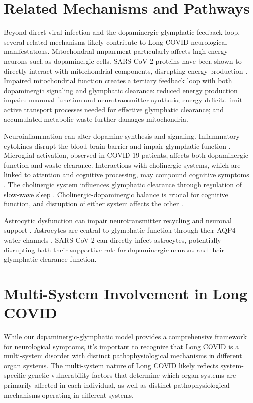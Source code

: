 \documentclass[12pt]{article}
\begin{document}
\section{Related Mechanisms and Pathways}

Beyond direct viral infection and the dopaminergic-glymphatic feedback loop, several related mechanisms likely contribute to Long COVID neurological manifestations. Mitochondrial impairment particularly affects high-energy neurons such as dopaminergic cells. SARS-CoV-2 proteins have been shown to directly interact with mitochondrial components, disrupting energy production \citep{Singh2020}. Impaired mitochondrial function creates a tertiary feedback loop with both dopaminergic signaling and glymphatic clearance: reduced energy production impairs neuronal function and neurotransmitter synthesis; energy deficits limit active transport processes needed for effective glymphatic clearance; and accumulated metabolic waste further damages mitochondria.

Neuroinflammation can alter dopamine synthesis and signaling. Inflammatory cytokines disrupt the blood-brain barrier and impair glymphatic function \citep{Banks2015}. Microglial activation, observed in COVID-19 patients, affects both dopaminergic function and waste clearance. Interactions with cholinergic systems, which are linked to attention and cognitive processing, may compound cognitive symptoms \citep{Leitzke2025}. The cholinergic system influences glymphatic clearance through regulation of slow-wave sleep \citep{Hablitz2019}. Cholinergic-dopaminergic balance is crucial for cognitive function, and disruption of either system affects the other \citep{Grizzell2014}.

Astrocytic dysfunction can impair neurotransmitter recycling and neuronal support \citep{Crunfli2023}. Astrocytes are central to glymphatic function through their AQP4 water channels \citep{Mestre2018}. SARS-CoV-2 can directly infect astrocytes, potentially disrupting both their supportive role for dopaminergic neurons and their glymphatic clearance function.

\section{Multi-System Involvement in Long COVID}

While our dopaminergic-glymphatic model provides a comprehensive framework for neurological symptoms, it's important to recognize that Long COVID is a multi-system disorder with distinct pathophysiological mechanisms in different organ systems. The multi-system nature of Long COVID likely reflects system-specific genetic vulnerability factors that determine which organ systems are primarily affected in each individual, as well as distinct pathophysiological mechanisms operating in different systems. 
\end{document}

